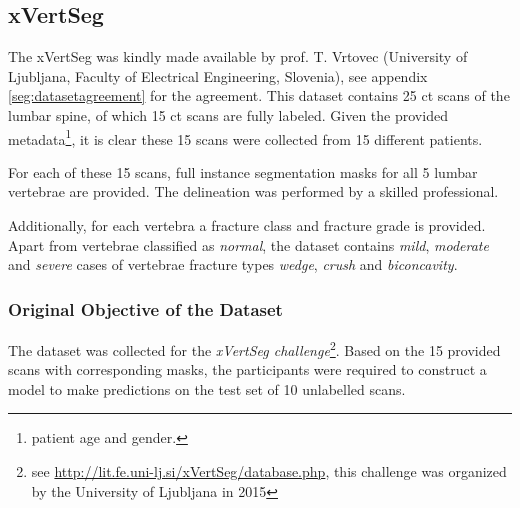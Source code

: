 \subsection{xVertSeg\label{sec:xVertSeg}}



The xVertSeg \cite{Ibragimov2014, Korez2015} was kindly made available by prof. T. Vrtovec (University of Ljubljana, Faculty of Electrical Engineering, Slovenia), see appendix \ref{seg:datasetagreement} for the agreement.
This dataset contains 25 \acrfull{ct} scans of the lumbar spine, of which 15 \acrshort{ct} scans are fully labeled.
Given the provided metadata\footnote{patient age and gender.}, it is clear these 15 scans were collected from 15 different patients.

For each of these 15 scans, full instance segmentation masks for all 5 lumbar vertebrae are provided. The delineation was performed by a skilled professional.

Additionally, for each vertebra a fracture class and fracture grade is provided. 
Apart from vertebrae classified as \textit{normal}, the dataset contains \textit{mild}, \textit{moderate} and \textit{severe} cases of vertebrae fracture types \textit{wedge}, \textit{crush} and \textit{biconcavity}.

\subsubsection{Original Objective of the Dataset}

The dataset was collected for the \textit{xVertSeg challenge}\footnote{see \url{http://lit.fe.uni-lj.si/xVertSeg/database.php}, this challenge was organized by the University of Ljubljana in 2015}.
Based on the 15 provided scans with corresponding masks, the participants were required to construct a model to make predictions on the test set of 10 unlabelled scans.

